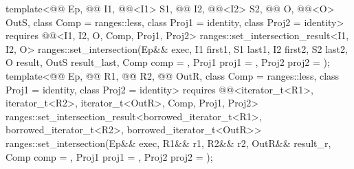 \begin{itemdecl}
template<@@ Ep, @@ I1, @@<I1> S1,
         @@ I2, @@<I2> S2,
         @@ O, @@<O> OutS, class Comp = ranges::less,
         class Proj1 = identity, class Proj2 = identity>
  requires @@<I1, I2, O, Comp, Proj1, Proj2>
  ranges::set_intersection_result<I1, I2, O>
    ranges::set_intersection(Ep&& exec, I1 first1, S1 last1,
                             I2 first2, S2 last2, O result, OutS result_last,
                             Comp comp = {}, Proj1 proj1 = {}, Proj2 proj2 = {});
template<@@ Ep, @@ R1, @@ R2,
         @@ OutR, class Comp = ranges::less,
         class Proj1 = identity, class Proj2 = identity>
  requires @@<iterator_t<R1>, iterator_t<R2>, iterator_t<OutR>, Comp, Proj1, Proj2>
  ranges::set_intersection_result<borrowed_iterator_t<R1>, borrowed_iterator_t<R2>,
                                  borrowed_iterator_t<OutR>>
    ranges::set_intersection(Ep&& exec, R1&& r1, R2&& r2, OutR&& result_r, Comp comp = {},
                             Proj1 proj1 = {}, Proj2 proj2 = {});
\end{itemdecl}

